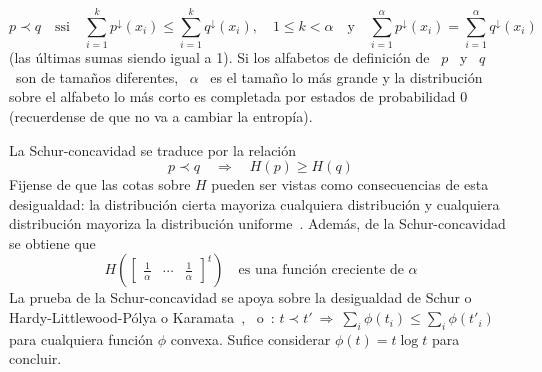 \begin{propiedades}
\begin{definicion}[Mayorizaci\'on]
    \[
    p  \prec  q  \quad   \mbox{ssi}  \quad  \sum_{i=1}^k  p^\downarrow(x_i)  \le
    \sum_{i=1}^k q^\downarrow(x_i), \quad 1 \le  k < \alpha \quad \mbox{y} \quad
    \sum_{i=1}^\alpha p^\downarrow(x_i)  = \sum_{i=1}^\alpha q^\downarrow(x_i)
    \]
    (las \'ultimas sumas siendo igual a 1).  Si los alfabetos de definici\'on de
    \ $p$ \ y  \ $q$ \ son de tama\~nos diferentes, \  $\alpha$ \ es el tama\~no
    lo m\'as  grande y  la distribuci\'on  sobre el alfabeto  lo m\'as  corto es
    completada por estados de probabilidad 0 (recuerdense de que no va a cambiar
    la entrop\'ia).
  \end{definicion}
  La  Schur-concavidad  se  traduce  por  la  relaci\'on
  \[
  p \prec  q \quad \Rightarrow  \quad H(p) \ge  H(q)
  \]
  Fijense de  que las cotas  sobre $H$ pueden  ser vistas como  consecuencias de
  esta desigualdad: la  distribuci\'on cierta mayoriza cualquiera distribuci\'on
  y  cualquiera distribuci\'on  mayoriza la  distribuci\'on uniforme~\cite[p.~9,
  (6)-(8)]{MarOlk11}.  Adem\'as, de la Schur-concavidad se obtiene que
  \[
  H\left( \begin{bmatrix}  \frac1\alpha & \cdots  & \frac1\alpha \end{bmatrix}^t
  \right) \quad \mbox{es una funci\'on creciente de } \alpha
  \]
  La prueba  de la  Schur-concavidad se  apoya sobre la  desigualdad de  Schur o
  Hardy-Littlewood-P\'olya    o     Karamata~\cite{Sch23,    HarLit29,    Kar32,
    HarLit52},~\cite[Cap.~3,                                 Prop.~C.1]{MarOlk11}
  o~\cite[Teorema~II.3.1]{Bha97}: $t \prec t' \: \Rightarrow \: \sum_i \phi(t_i)
  \le  \sum_i  \phi(t'_i)$ para  cualquiera  funci\'on  $\phi$ convexa.   Sufice
  considerar $\phi(t) = t \log t$ para concluir.
\end{propiedades}
%


